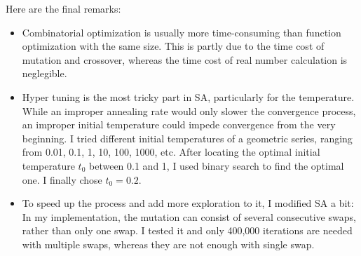 \documentclass{IEEEtran}
\begin{document}
{{        Here are the final remarks:
        \begin{itemize}
            \item Combinatorial optimization is usually more time-consuming than function optimization with the same size.
            This is partly due to the time cost of mutation and crossover, whereas the time cost of real number calculation is neglegible.
            \item Hyper tuning is the most tricky part in SA, particularly for the temperature. 
            While an improper annealing rate would only slower the convergence process, 
            an improper initial temperature could impede convergence from the very beginning.
            I tried different initial temperatures of a geometric series, ranging from 0.01, 0.1, 1, 10, 100, 1000, etc. 
            After locating the optimal initial temperature $t_0$ between 0.1 and 1, I used binary search to find the optimal one.
            I finally chose $t_0 = 0.2$.
            \item To speed up the process and add more exploration to it, I modified SA a bit:
            In my implementation, the mutation can consist of several consecutive swaps, rather than only one swap.
            I tested it and only 400,000 iterations are needed with multiple swaps, whereas they are not enough with single swap.
        \end{itemize}
    }
}
\end{document}
